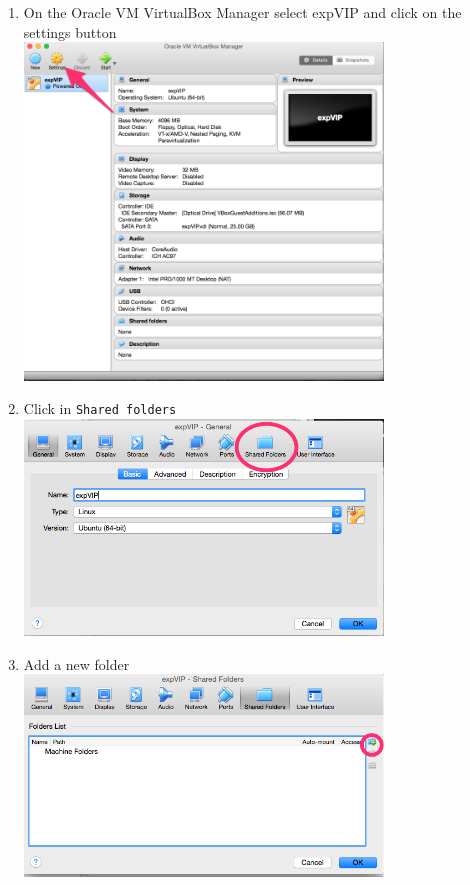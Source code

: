 \begin{enumerate}
\def\labelenumi{\arabic{enumi}.}
\itemsep1pt\parskip0pt
\item
  On the Oracle VM VirtualBox Manager select expVIP and click on the
  settings button \\ \includegraphics[width=0.75\textwidth]{expVIP/tutorial/images/Shared_Folder01.png}
\item
  Click in \lstinline!Shared folders!
  \\ \includegraphics[width=0.75\textwidth]{expVIP/tutorial/images/Shared_Folder02.png}
\item
  Add a new folder \\ \includegraphics[width=0.75\textwidth]{expVIP/tutorial/images/Shared_Folder03.png}

\end{enumerate}
